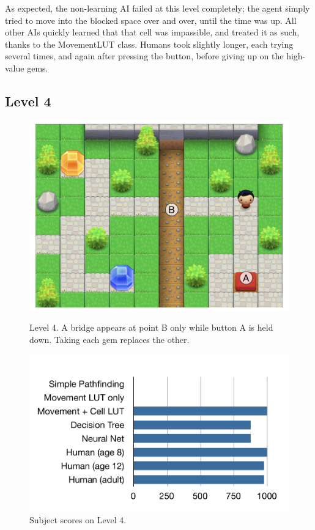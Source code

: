 \documentclass{article}
\begin{document}
As expected, the non-learning AI failed at this level completely; the agent simply tried to move into the blocked space over and over, until the time was up.  All other AIs quickly learned that that cell was impassible, and treated it as such, thanks to the MovementLUT class.  Humans took slightly longer, each trying several times, and again after pressing the button, before giving up on the high-value gems.

\subsection{Level 4}

\begin{figure}[ht]
\begin{minipage}[t]{0.45\linewidth}
\centering
\includegraphics[width=\textwidth]{figLevel4.pdf}
\caption{Level 4. A bridge appears at point B only while button A is held down.  Taking each gem replaces the other.}
\label{figLevel4}
\end{minipage}
\hspace{0.5cm}
\begin{minipage}[b]{0.45\linewidth}
\centering
\includegraphics[width=\textwidth]{figScores4.pdf}
\caption{Subject scores on Level 4.}
\label{figScores4}
\end{minipage}
\end{figure}
\end{document}
